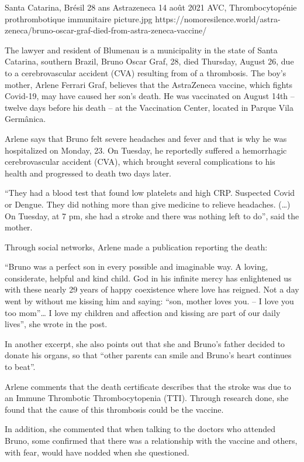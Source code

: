           {Santa Catarina, Brésil}
          {28 ans}
          {Astrazeneca}
          {14 août 2021}
          {AVC,  Thrombocytopénie prothrombotique immunitaire}
          {picture.jpg}
          {https://nomoresilence.world/astra-zeneca/bruno-oscar-graf-died-from-astra-zeneca-vaccine/}
          {

The lawyer and resident of Blumenau is a municipality in the state of Santa
Catarina, southern Brazil, Bruno Oscar Graf, 28, died Thursday, August 26, due
to a cerebrovascular accident (CVA) resulting from of a thrombosis. The boy’s
mother, Arlene Ferrari Graf, believes that the AstraZeneca vaccine, which fights
Covid-19, may have caused her son’s death. He was vaccinated on August 14th –
twelve days before his death – at the Vaccination Center, located in Parque Vila
Germânica.

Arlene says that Bruno felt severe headaches and fever and that is why he was
hospitalized on Monday, 23. On Tuesday, he reportedly suffered a hemorrhagic
cerebrovascular accident (CVA), which brought several complications to his
health and progressed to death two days later.

“They had a blood test that found low platelets and high CRP. Suspected Covid or
Dengue. They did nothing more than give medicine to relieve headaches. (…) On
Tuesday, at 7 pm, she had a stroke and there was nothing left to do”, said the
mother.

Through social networks, Arlene made a publication reporting the death:

“Bruno was a perfect son in every possible and imaginable way. A loving,
considerate, helpful and kind child. God in his infinite mercy has enlightened
us with these nearly 29 years of happy coexistence where love has reigned. Not a
day went by without me kissing him and saying: “son, mother loves you. – I love
you too mom”… I love my children and affection and kissing are part of our daily
lives”, she wrote in the post.

In another excerpt, she also points out that she and Bruno’s father decided to
donate his organs, so that “other parents can smile and Bruno’s heart continues
to beat”.

Arlene comments that the death certificate describes that the stroke was due to
an Immune Thrombotic Thrombocytopenia (TTI). Through research done, she found
that the cause of this thrombosis could be the vaccine.

In addition, she commented that when talking to the doctors who attended Bruno,
some confirmed that there was a relationship with the vaccine and others, with
fear, would have nodded when she questioned.

}
